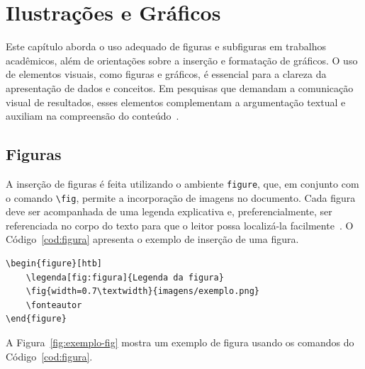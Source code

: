 
\chapter{Ilustrações e Gráficos}
\label{cap:ilustracoes}

Este capítulo aborda o uso adequado de figuras e subfiguras em trabalhos acadêmicos, além de orientações sobre a inserção e formatação de gráficos. O uso de elementos visuais, como figuras e gráficos, é essencial para a clareza da apresentação de dados e conceitos. Em pesquisas que demandam a comunicação visual de resultados, esses elementos complementam a argumentação textual e auxiliam na compreensão do conteúdo~\cite{tufte1990envisioning}.

\section{Figuras}
\label{sec:figuras}

A inserção de figuras é feita utilizando o ambiente \texttt{figure}, que, em conjunto com o comando \texttt{\textbackslash fig}, permite a incorporação de imagens no documento. Cada figura deve ser acompanhada de uma legenda explicativa e, preferencialmente, ser referenciada no corpo do texto para que o leitor possa localizá-la facilmente~\cite{knuth1984texbook}. O Código~\ref{cod:figura} apresenta o exemplo de inserção de uma figura.

\begin{codigo}[htb]
\begin{lstlisting}
\begin{figure}[htb]
    \legenda[fig:figura]{Legenda da figura}
    \fig{width=0.7\textwidth}{imagens/exemplo.png}
    \fonteautor
\end{figure}
\end{lstlisting}
\fonteautor
\end{codigo}

A Figura~\ref{fig:exemplo-fig} mostra um exemplo de figura usando os comandos do  Código~\ref{cod:figura}.

\begin{figure}[htb]
\end{figure}

